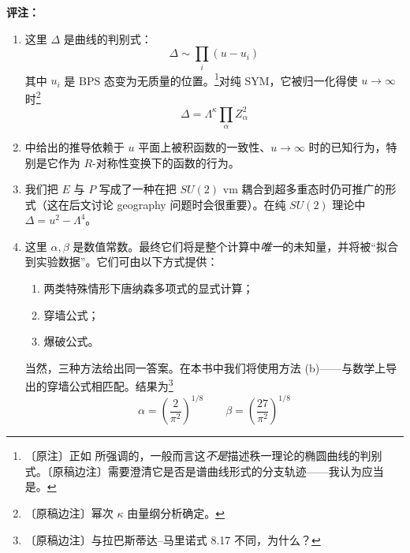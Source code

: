 \medskip
\noindent\textbf{评注：}
\begin{enumerate}[label=\arabic*., leftmargin=2.1em]
\item 这里 $\Delta$ 是曲线的判别式：
\begin{equation}
\Delta\sim\prod_{i}(u-u_{i})
\tag{5.63}
\end{equation}
其中 $u_{i}$ 是 BPS 态变为无质量的位置。\footnote{〔原注〕正如 \cite{ref49} 所强调的，一般而言这\emph{不是}描述秩一理论的椭圆曲线的判别式。〔原稿边注〕需要澄清它是否是谱曲线形式的分支轨迹——我认为应当是。}对纯 SYM，它被归一化得使 $u\to\infty$ 时\footnote{〔原稿边注〕幂次 $\kappa$ 由量纲分析确定。}
\begin{equation}
\Delta=\Lambda^{\kappa}\prod_{\alpha}Z_{\alpha}^{2}
\tag{5.64}
\end{equation}
\item \cite{ref38,ref56} 中给出的推导依赖于 $u$ 平面上被积函数的一致性、$u\to\infty$ 时的已知行为，特别是它作为 $R$-对称性变换下的函数的行为。
\item 我们把 $E$ 与 $P$ 写成了一种在把 $SU(2)$ vm 耦合到超多重态时仍可推广的形式（这在后文讨论 geography 问题时会很重要）。在纯 $SU(2)$ 理论中 $\Delta=u^{2}-\Lambda^{4}$。
\item 这里 $\alpha,\beta$ 是数值常数。最终它们将是整个计算中\emph{唯一}的未知量，并将被“拟合到实验数据”。它们可由以下方式提供：
\begin{enumerate}[label=\alph*.), leftmargin=1.8em]
\item 两类特殊情形下唐纳森多项式的显式计算；
\item 穿墙公式；
\item 爆破公式。
\end{enumerate}
当然，三种方法给出同一答案。在本书中我们将使用方法 (b)——与数学上导出的穿墙公式相匹配。结果为\footnote{〔原稿边注〕与拉巴斯蒂达--马里诺式 8.17 不同，为什么？}
\begin{equation}
\alpha=\left(\frac{2}{\pi^{2}}\right)^{1/8}\qquad
\beta=\left(\frac{27}{\pi^{2}}\right)^{1/8}
\tag{5.65}
\end{equation}
\end{enumerate}


